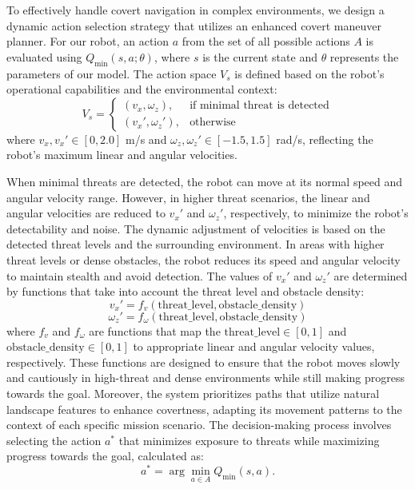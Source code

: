 To effectively handle covert navigation in complex environments, we design a dynamic action selection strategy that utilizes an enhanced covert maneuver planner. For our robot, an action \(a\) from the set of all possible actions \(A\) is evaluated using \(Q_{\min}(s, a; \theta)\), where \(s\) is the current state and \(\theta\) represents the parameters of our model. The action space \(V_s\) is defined based on the robot's operational capabilities and the environmental context:
\[
V_s =
\begin{cases}
(v_x, \omega_z), & \text{if minimal threat is detected} \\
(v_x', \omega_z'), & \text{otherwise}
\end{cases}
\]
where \(v_x, v_x' \in [0, 2.0]\) m/s and \(\omega_z, \omega_z' \in [-1.5, 1.5]\) rad/s, reflecting the robot's maximum linear and angular velocities.

When minimal threats are detected, the robot can move at its normal speed and angular velocity range. However, in higher threat scenarios, the linear and angular velocities are reduced to \(v_x'\) and \(\omega_z'\), respectively, to minimize the robot's detectability and noise. The dynamic adjustment of velocities is based on the detected threat levels and the surrounding environment. In areas with higher threat levels or dense obstacles, the robot reduces its speed and angular velocity to maintain stealth and avoid detection. The  values of \(v_x'\) and \(\omega_z'\) are determined by functions that take into account the threat level and obstacle density:
\[
v_x' = f_v(\text{threat\_level}, \text{obstacle\_density})
\]
\[
\omega_z' = f_{\omega}(\text{threat\_level}, \text{obstacle\_density})
\]
where \(f_v\) and \(f_{\omega}\) are functions that map the \(\text{threat\_level} \in [0, 1]\)  and \(\text{obstacle\_density} \in [0, 1]\) to appropriate linear and angular velocity values, respectively. These functions are designed to ensure that the robot moves slowly and cautiously in high-threat and dense environments while still making progress towards the goal. Moreover, the system prioritizes paths that utilize natural landscape features to enhance covertness, adapting its movement patterns to the context of each specific mission scenario. The decision-making process involves selecting the action \(a^*\) that minimizes exposure to threats while maximizing progress towards the goal, calculated as:
\[
a^* = \arg\min_{a \in A} Q_{\min}(s, a).
\]



